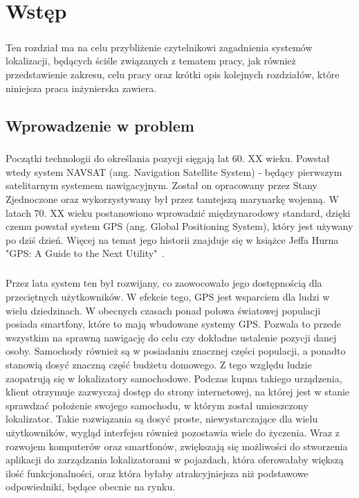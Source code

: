 \chapter{Wstęp}
\label{ch:wstep}
\paragraph{}
Ten rozdział ma na celu przybliżenie czytelnikowi zagadnienia systemów lokalizacji, będących ściśle związanych z tematem pracy, jak również przedstawienie zakresu, celu pracy oraz krótki opis kolejnych rozdziałów, które niniejsza praca inżynierska zawiera.

\section{Wprowadzenie w problem}

\paragraph{}
Początki technologii do określania pozycji sięgają lat 60. XX wieku. Powstał wtedy system NAVSAT (ang. Navigation Satellite System) - będący pierwszym satelitarnym systemem nawigacyjnym. Został on opracowany przez Stany Zjednoczone oraz wykorzystywany był przez tamtejszą marynarkę wojenną. W latach 70. XX wieku postanowiono wprowadzić międzynarodowy standard, dzięki czemu powstał system GPS (ang. Global Positioning System), który jest używany po dziś dzień. Więcej na temat jego historii znajduje się w książce Jeffa Hurna "GPS: A Guide to the Next Utility"\ \cite{bib:gps}.

\paragraph{}
Przez lata system ten był rozwijany, co zaowocowało jego dostępnością dla przeciętnych użytkowników. W efekcie tego, GPS jest wsparciem dla ludzi w wielu dziedzinach. W obecnych czasach ponad połowa światowej populacji posiada smartfony, które to mają wbudowane systemy GPS. Pozwala to przede wszystkim na sprawną nawigację do celu czy  dokładne ustalenie pozycji danej osoby. Samochody również są w posiadaniu znacznej części populacji, a ponadto stanowią dosyć znaczną część budżetu domowego. Z tego względu ludzie zaopatrują się w lokalizatory samochodowe. Podczas kupna takiego urządzenia, klient otrzymuje zazwyczaj dostęp do strony internetowej, na której jest w stanie sprawdzać położenie swojego samochodu, w którym został umieszczony lokalizator. Takie rozwiązania są dosyć proste, niewystarczające dla wielu użytkowników, wygląd interfejsu również pozostawia wiele do życzenia. Wraz z rozwojem komputerów oraz smartfonów, zwiększają się możliwości do stworzenia aplikacji do zarządzania lokalizatorami w pojazdach, która oferowałaby większą ilość funkcjonalności, oraz która byłaby atrakcyjniejsza niż podstawowe odpowiedniki, będące obecnie na rynku.

